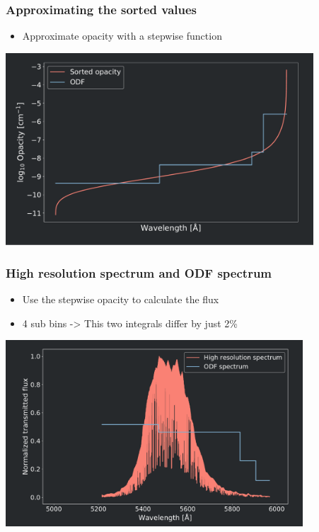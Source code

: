 \frame
{
	\frametitle{Approximating the sorted values}
	\begin{itemize}
		\item Approximate opacity with a stepwise function
	\end{itemize}
    \centering
	\includegraphics[width=115mm]{images/sorted_opacity_and_sub_bins_1}
}

\frame
{
	\frametitle{High resolution spectrum and ODF spectrum}
	\begin{itemize}[(I)]
		\item<1-> Use the stepwise opacity to calculate the flux 
		\item<2-> 4 sub bins -> This two integrals differ by just \alert{2\%}
	\end{itemize}
	\centering
	\includegraphics[width=111mm]{images/spectra_transmitted_and_spectra_odf}
}

